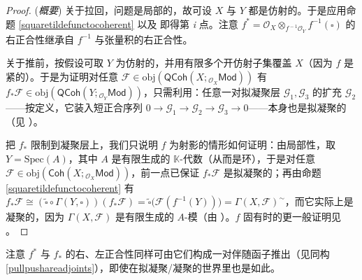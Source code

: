 \begin{proof}(\textit{概要})
关于拉回，问题是局部的，故可设 $X$ 与 $Y$ 都是仿射的。于是应用命题 \ref{squaretildefunctocoherent} 以及 \cite[命题 II.5.2]{[Har77]} 即得第 \textit{i} 点。注意 $f^*=\mathcal{O}_X\otimes_{f^{\!-\!1}\!\mathcal{O}_Y}\! f^{-1}(\square)$ 的右正合性继承自 $f^{-1}$ 与张量积的右正合性。 

关于推前，按假设可取 $Y$ 为仿射的，并用有限多个开仿射子集覆盖 $X$（因为 $f$ 是紧的）。于是为证明对任意 $\mathcal{F}\in\text{obj}(\mathsf{QCoh}(X;{}_{\mathcal{O}_X}\!\mathsf{Mod}))$ 有 $f_*\mathcal{F}\in\text{obj}(\mathsf{QCoh}(Y;{}_{\mathcal{O}_Y}\!\mathsf{Mod}))$，只需利用：任意一对拟凝聚层 $\mathcal{G}_1,\mathcal{G}_3$ 的扩充 $\mathcal{G}_2$——按定义，它装入短正合序列 $0\rightarrow\mathcal{G}_1\rightarrow\mathcal{G}_2\rightarrow\mathcal{G}_3\rightarrow 0$——本身也是拟凝聚的（见 \cite[命题 II.5.7]{[Har77]}）。 

把 $f_*$ 限制到凝聚层上，我们只说明 $f$ 为射影的情形如何证明：由局部性，取 $Y=\text{Spec}(A)$，其中 $A$ 是有限生成的 $\mathbb{K}$-代数（从而是环），于是对任意 $\mathcal{F}\in\text{obj}(\mathsf{Coh}(X;{}_{\mathcal{O}_X}\!\mathsf{Mod}))$，前一点已保证 $f_*\mathcal{F}$ 是拟凝聚的；再由命题 \ref{squaretildefunctocoherent} 有 $f_*\mathcal{F}\cong(\widetilde{\square}\circ\Gamma(Y,\square))(f_*\mathcal{F})=\widetilde{\square}\big(\mathcal{F}(f^{-1}(Y))\big)=\Gamma(X,\mathcal{F})^\sim$，而它实际上是凝聚的，因为 $\Gamma(X,\mathcal{F})$ 是有限生成的 $A$-模（由 \cite[定理 II.5.19]{[Har77]}）。$f$ 固有时的更一般证明见 \cite[第 III.8 节]{[Har77]}。  
\end{proof}

注意 $f^*$ 与 $f_*$ 的右、左正合性同样可由它们构成一对伴随函子推出（见同构 \eqref{pullpushareadjoints}），即使在拟凝聚/凝聚的世界里也是如此。

